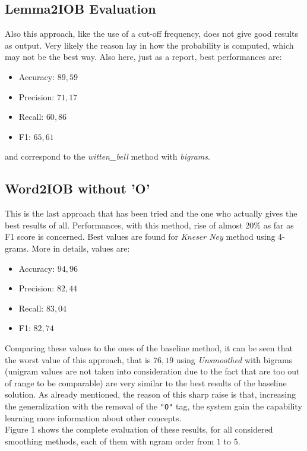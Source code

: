 \documentclass[11pt,a4paper]{article}
\begin{document}
\subsection{Lemma2IOB Evaluation}

Also this approach, like the use of a cut-off frequency, does not give good results as output. Very likely the reason lay in how the probability is computed, which may not be the best way. Also here, just as a report, best performances are:
\begin{itemize}
	\item Accuracy: $89,59$
	\item Precision: $71,17$
	\item Recall: $60,86$
	\item F1: $65,61$
\end{itemize}
and correspond to the \textit{witten\_bell} method with \textit{bigrams}.


\subsection{Word2IOB without 'O'}

This is the last approach that has been tried and the one who actually gives the best results of all. Performances, with this method, rise of almost 20\% as far as F1 score is concerned. Best values are found for \textit{Kneser Ney} method using 4-grams. More in details, values are:
\begin{itemize}
	\item Accuracy: $94,96$
	\item Precision: $82,44$
	\item Recall: $83,04$
	\item F1: $82,74$
\end{itemize}

Comparing these values to the ones of the baseline method, it can be seen that the worst value of this approach, that is $76,19$ using \textit{Unsmoothed} with bigrams (unigram values are not taken into consideration due to the fact that are too out of range to be comparable) are very similar to the best results of the baseline solution. As already mentioned, the reason of this sharp raise is that, increasing the generalization with the removal of the {\tt "O"} tag, the system gain the capability learning more information about other concepts.\\
Figure 1 shows the complete evaluation of these results, for all considered smoothing methods, each of them with ngram order from $1$ to $5$.
\end{document}
